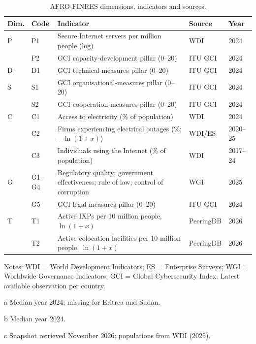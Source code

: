 \documentclass[11pt,a4paper]{article}
\begin{document}
\begin{table}[htbp]
\centering
\caption{AFRO-FINRES dimensions, indicators and sources.}
\label{tab:ind}
\small
\begin{threeparttable}
\begin{tabularx}{\textwidth}{l l Y l l}
\toprule
Dim. & Code & Indicator & Source & Year \\
\midrule
P & P1 & Secure Internet servers per million people (log) & WDI & 2024 \\
  & P2 & GCI capacity-development pillar (0--20) & ITU GCI & 2024 \\
D & D1 & GCI technical-measures pillar (0--20) & ITU GCI & 2024 \\
S & S1 & GCI organisational-measures pillar (0--20) & ITU GCI & 2024 \\
  & S2 & GCI cooperation-measures pillar (0--20) & ITU GCI & 2024 \\
C & C1 & Access to electricity (\% of population) & WDI & 2024 \\
  & C2 & Firms experiencing electrical outages (\%; $-\ln(1+x)$) & WDI/ES & 2020--25 \\
  & C3 & Individuals using the Internet (\% of population) & WDI & 2017--24 \\
G & G1--G4 & Regulatory quality; government effectiveness; rule of law; control of corruption & WGI & 2025 \\
  & G5 & GCI legal-measures pillar (0--20) & ITU GCI & 2024 \\
T & T1 & Active IXPs per 10 million people, $\ln(1+x)$ & PeeringDB & 2026 \\
  & T2 & Active colocation facilities per 10 million people, $\ln(1+x)$ & PeeringDB & 2026 \\
\bottomrule
\end{tabularx}
\begin{tablenotes}\footnotesize
\item Notes: WDI = World Development Indicators; ES = Enterprise Surveys; WGI = Worldwide Governance Indicators; GCI = Global Cybersecurity Index. Latest available observation per country.
\item[a] Median year 2024; missing for Eritrea and Sudan. \item[b] Median year 2024. \item[c] Snapshot retrieved November 2026; populations from WDI (2025).
\end{tablenotes}
\end{threeparttable}
\end{table}
\end{document}
